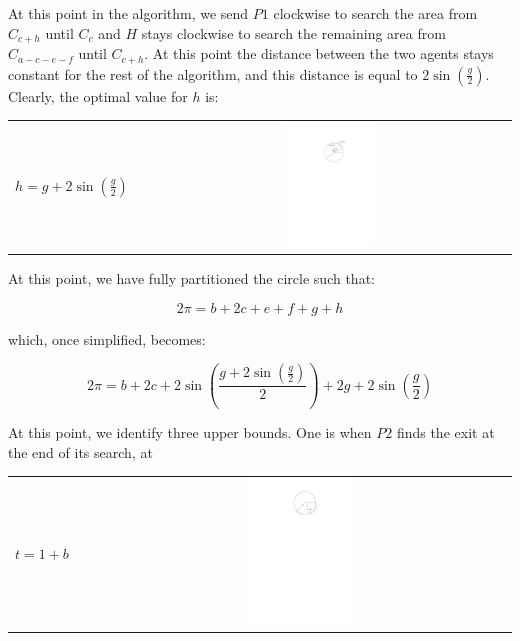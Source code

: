 \documentclass[11pt]{article}
\begin{document}
\begin{flushleft}
    At this point in the algorithm, we send $P1$ clockwise to search the area from $C_{c + h}$ until
    $C_{c}$ and $H$ stays clockwise to search the remaining area from $C_{a - c - e - f}$ until $C_{c + h}$. At this point the distance between the two agents stays constant for the rest of the algorithm, and this distance is equal to $2\sin(\frac{g}{2})$. Clearly, the optimal value for $h$ is:

    \begin{tabularx}{\textwidth}{lXc}
        \multirow{2}{*}{$h = g+2\sin(\frac{g}{2})$} & & \parbox[c]{0.25\textwidth}{\includegraphics[width=0.25\textwidth]{Q2S1_Eq/Q2S1_Old/eq_6.pdf}} \\
    \end{tabularx}


    At this point, we have fully partitioned the circle such that:

    \[ 2\pi = b + 2c + e + f + g + h\]

    which, once simplified, becomes:

    \[ 2\pi = b + 2c + 2\sin(\frac{g + 2\sin(\frac{g}{2})}{2}) + 2g + 2\sin(\frac{g}{2}) \]

    At this point, we identify three upper bounds. One is when $P2$ finds the exit at the end of its
    search, at

    \begin{tabularx}{\textwidth}{lXc}
        \multirow{2}{*}{$t = 1+b$} & & \parbox[c]{0.25\textwidth}{\includegraphics[width=0.25\textwidth]{Q2S1_Eq/Q2S1_Old/ub_1.pdf}} \\
    \end{tabularx}


\end{flushleft}
\end{document}
